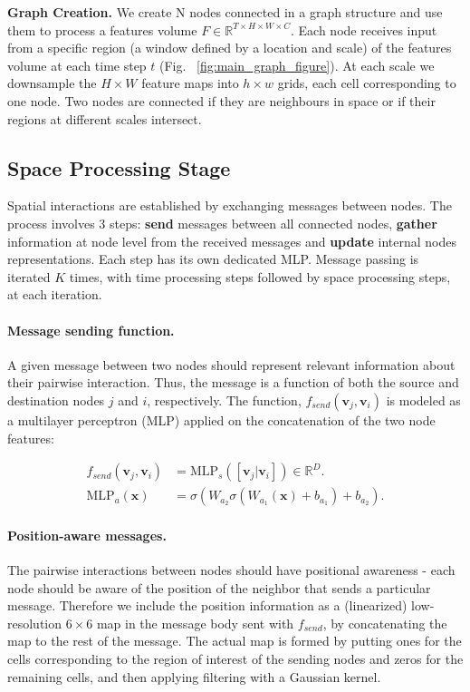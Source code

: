 \documentclass{article}
\begin{document}
\noindent \textbf{Graph Creation.}  We create N nodes connected in a graph structure and use them to process a features volume $F \in \mathbb{R}^{T\times H \times W \times C}$. Each node receives input from a specific region (a window defined by a location and scale) of the features volume at each time step $t$ (Fig. ~\ref{fig:main_graph_figure}). At each scale we downsample the $H \times W$ feature maps into $h\times w$ grids, each cell corresponding to one node. Two nodes are connected if they are neighbours in space or if  
their regions at different scales intersect. 

\subsection{Space Processing Stage}
Spatial interactions are established by exchanging messages between nodes. The process involves 3 steps: \textbf{send} messages between all connected nodes, \textbf{gather} information at node level from the received messages and \textbf{update} internal nodes representations. Each step has its own dedicated MLP. Message passing is iterated $K$ times, with time processing steps followed by space processing steps, at each iteration.


\paragraph{Message sending function.} A given message between two nodes should represent relevant information about their pairwise interaction. Thus, the message is a function of both the source and destination nodes $j$ and $i$, respectively. The function, $f_{send}(\mathbf{v}_j, \mathbf{v}_i)$ is modeled as a multilayer perceptron (MLP) applied on the concatenation of the two node features: 

\begin{align}
    f_{send}(\mathbf{v}_j,\mathbf{v}_i) &= \text{MLP}_s( [\mathbf{v}_j | \mathbf{v}_i])  \in \mathbb{R}^{D}. \\
    \text{MLP}_a(\mathbf{x}) &= \sigma(W_{a_2}  \sigma(W_{a_1} (\mathbf{x}) + b_{a_1}) + b_{a_2}).
\end{align}

\paragraph{Position-aware messages.}
The pairwise interactions between nodes should have positional awareness - each node should be aware of the position of the neighbor that sends a particular message. Therefore we include the position information as a (linearized) low-resolution $6 \times 6$ map in the message body sent with $f_{send}$, by concatenating the map to the rest of the message. The actual map is formed by putting ones for the cells corresponding to the region of interest of the sending nodes and zeros for the remaining cells, and then applying filtering with a Gaussian kernel.
\end{document}
